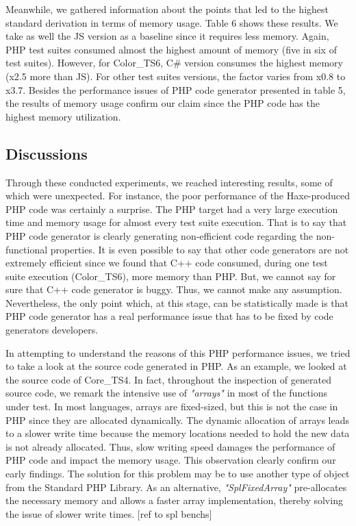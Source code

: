 Meanwhile, we gathered information about the points that led to the highest standard derivation in terms of memory usage. Table 6 shows these results. We take as well the JS version as a baseline since it requires less memory. Again, PHP test suites consumed almost the highest amount of memory (five in six of test suites). However, for Color\_TS6, C\# version consumes the highest memory (x2.5 more than JS). For other test suites versions, the factor varies from x0.8 to x3.7. Besides the performance issues of PHP code generator presented in table 5, the results of memory usage confirm our claim since the PHP code has the highest memory utilization.
 


\subsection{Discussions}
Through these conducted experiments, we reached interesting results, some of which were unexpected.
For instance, the poor performance of the Haxe-produced PHP code was certainly a surprise. 
The PHP target had a very large execution time and memory usage for almost every test suite execution. 
That is to say that PHP code generator is clearly generating non-efficient code regarding the non-functional properties. It is even possible to say that other code generators are not extremely efficient since we found that C++ code consumed, during one test suite execution (Color\_TS6), more memory than PHP. But, we cannot say for sure that C++ code generator is buggy. Thus, we cannot make any assumption. Nevertheless, the only point which, at this stage, can be statistically made is that PHP code generator has a real performance issue that has to be fixed by code generators developers. 

In attempting to understand the reasons of this PHP performance issues, we tried to take a look at the source code generated in PHP. As an example, we looked at the source code of Core\_TS4. 
In fact, throughout the inspection of generated source code, we remark the intensive use of \textit{"arrays"} in most of the functions under test. In most languages, arrays are fixed-sized, but this is not the case in PHP since they are allocated dynamically. The dynamic allocation of arrays  leads to a slower write time because the memory locations needed to hold the new data is not already allocated. Thus, slow writing speed damages the performance of PHP code and impact the memory usage. This observation clearly confirm our early findings. The solution for this problem may be to use another type of object from the Standard PHP Library. As an alternative, \textit{"SplFixedArray"} pre-allocates the necessary memory and allows a faster array implementation, thereby solving the issue of slower write times. [ref to spl benchs]

